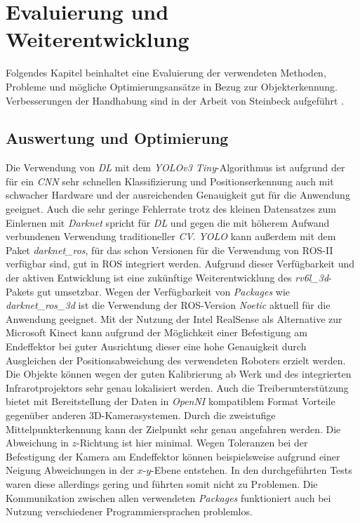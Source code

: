 \chapter{Evaluierung und Weiterentwicklung} \label{sec:evaluierung}

Folgendes Kapitel beinhaltet eine Evaluierung der verwendeten Methoden, Probleme und mögliche Optimierungsansätze in Bezug zur Objekterkennung. Verbesserungen der Handhabung sind in der Arbeit von Steinbeck aufgeführt \cite[Abschnitt~5]{steinbeck_entwicklung_2022}.

\section{Auswertung und Optimierung}

Die Verwendung von \textit{\ac{DL}} mit dem \textit{YOLOv3 Tiny}-Algorithmus ist aufgrund der für ein \textit{\ac{CNN}} sehr schnellen Klassifizierung und Positionserkennung auch mit schwacher Hardware und der ausreichenden Genauigkeit gut für die Anwendung geeignet. Auch die sehr geringe Fehlerrate trotz des kleinen Datensatzes zum Einlernen mit \textit{Darknet} spricht für \textit{\ac{DL}} und gegen die mit höherem Aufwand verbundenen Verwendung traditioneller \textit{\ac{CV}}. \textit{YOLO} kann außerdem mit dem Paket \textit{darknet\_ros}, für das schon Versionen für die Verwendung von \ac{ROS}-II verfügbar sind, gut in \ac{ROS} integriert werden. Aufgrund dieser Verfügbarkeit und der aktiven Entwicklung ist eine zukünftige Weiterentwicklung des \textit{rv6l\_3d}-Pakets gut umsetzbar. Wegen der Verfügbarkeit von \textit{Packages} wie \textit{darknet\_ros\_3d} ist die Verwendung der \ac{ROS}-Version \textit{Noetic} aktuell für die Anwendung geeignet. Mit der Nutzung der Intel RealSense als Alternative zur Microsoft Kinect kann aufgrund der Möglichkeit einer Befestigung am Endeffektor bei guter Ausrichtung dieser eine hohe Genauigkeit durch Ausgleichen der Positionsabweichung des verwendeten Roboters erzielt werden. Die Objekte können wegen der guten Kalibrierung ab Werk und des integrierten Infrarotprojektors sehr genau lokalisiert werden. Auch die Treiberunterstützung bietet mit Bereitstellung der Daten in \textit{OpenNI} kompatiblem Format Vorteile gegenüber anderen 3D-Kamerasystemen. Durch die zweistufige Mittelpunkterkennung kann der Zielpunkt sehr genau angefahren werden. Die Abweichung in $z$-Richtung ist hier minimal. Wegen Toleranzen bei der Befestigung der Kamera am Endeffektor können beispielsweise aufgrund einer Neigung Abweichungen in der $x$-$y$-Ebene entstehen. In den durchgeführten Tests waren diese allerdings gering und führten somit nicht zu Problemen. Die Kommunikation zwischen allen verwendeten \textit{Packages} funktioniert auch bei Nutzung verschiedener Programmiersprachen problemlos.

